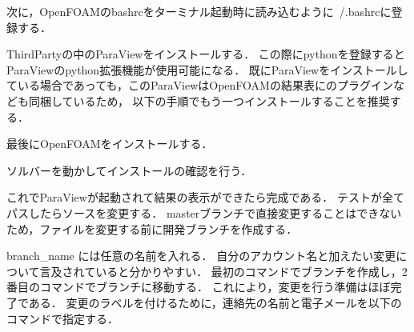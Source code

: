 \documentclass{ltjoc}
\begin{document}
次に，OpenFOAMのbashrcをターミナル起動時に読み込むように~/.bashrcに登録する．

\begin{shbox}
\end{shbox}

ThirdPartyの中のParaViewをインストールする．
この際にpythonを登録するとParaViewのpython拡張機能が使用可能になる．
既にParaViewをインストールしている場合であっても，このParaViewはOpenFOAMの結果表にのプラグインなども同梱しているため，
以下の手順でもう一つインストールすることを推奨する．

\begin{shbox}
\end{shbox}

最後にOpenFOAMをインストールする．

\begin{shbox}
\end{shbox}

ソルバーを動かしてインストールの確認を行う．

\begin{shbox}
\end{shbox}

これでParaViewが起動されて結果の表示ができたら完成である．
テストが全てパスしたらソースを変更する．
masterブランチで直接変更することはできないため，ファイルを変更する前に開発ブランチを作成する．

\begin{shbox}
\end{shbox}
\begin{shbox}
\end{shbox}

branch\_name には任意の名前を入れる．
自分のアカウント名と加えたい変更について言及されていると分かりやすい．
最初のコマンドでブランチを作成し，2番目のコマンドでブランチに移動する．
これにより，変更を行う準備はほぼ完了である．
変更のラベルを付けるために，連絡先の名前と電子メールを以下のコマンドで指定する．
\end{document}
